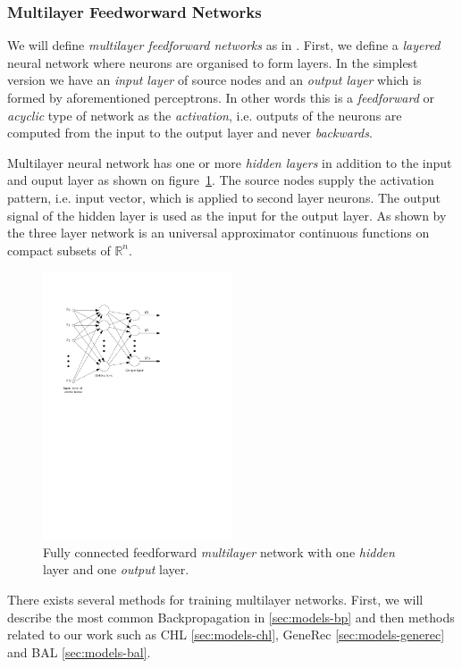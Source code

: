 \subsubsection{Multilayer Feedworward Networks} 
\label{sec:theory-multilayer} 

We will define \emph{multilayer feedforward networks} as in \citet{haykin1994neural}. First, we define a \emph{layered} neural network where neurons are organised to form layers. In the simplest version we have an \emph{input layer} of source nodes and an \emph{output layer} which is formed by aforementioned perceptrons. In other words this is a \emph{feedforward} or \emph{acyclic} type of network as the \emph{activation}, i.e. outputs of the neurons are computed from the input to the output layer and never \emph{backwards}. 

Multilayer neural network has one or more \emph{hidden layers} in addition to the input and ouput layer as shown on figure~\ref{fig:multilayer}. The source nodes supply the activation pattern, i.e. input vector, which is applied to second layer neurons. The output signal of the hidden layer is used as the input for the output layer. As shown by \citet{cybenko1989approximation} the three layer network is an universal approximator continuous functions on compact subsets of $\mathbb{R}^n$.

\begin{figure}[H]
  \centering
  \includegraphics[width=0.5\textwidth]{img/multilayer.pdf}    
  \caption{Fully connected feedforward \emph{multilayer} network with one \emph{hidden} layer and one \emph{output} layer. } 
  \label{fig:multilayer}
\end{figure}

There exists several methods for training multilayer networks. First, we will describe the most common Backpropagation in \ref{sec:models-bp} and then methods related to our work such as CHL \ref{sec:models-chl}, GeneRec \ref{sec:models-generec} and BAL \ref{sec:models-bal}. 
